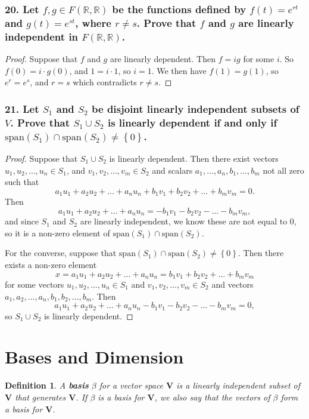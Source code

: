 \documentclass{article}
\newtheorem*{definition}{Definition}
\newcommand{\R}{\mathbb{R}}
\begin{document}
\subsubsection*{20. Let $f, g \in F(\R, \R)$ be the functions defined by $f(t) = e^{rt}$ and $g(t) = e^{st}$, where $r \ne s$. Prove that $f$ and $g$ are linearly independent in $F(\R, \R)$.}
\begin{proof}
	Suppose that $f$ and $g$ are linearly dependent. Then $f = ig$ for some $i$. So $f(0) = i \cdot g(0)$, and $1 = i \cdot 1$, so $i = 1$. We then have $f(1) = g(1)$, so $e^r = e^s$, and $r = s$ which contradicts $r \ne s$.
\end{proof}

\subsubsection*{21. Let $S_1$ and $S_2$ be disjoint linearly independent subsets of $V$. Prove that $S_1 \cup S_2$ is linearly dependent if and only if $\text{span}(S_1) \cap \text{span}(S_2) \ne \left\{0\right\}$.}
\begin{proof}
	Suppose that $S_1 \cup S_2$ is linearly dependent. Then there exist vectors $u_1, u_2, \dots, u_n \in S_1$, and $v_1, v_2, \dots, v_m \in S_2$ and scalars $a_1, \dots, a_n, b_1, \dots, b_m$ not all zero such that \[ a_1u_1 + a_2u_2 + \dots + a_nu_n + b_1v_1 + b_2v_2 + \dots + b_mv_m = 0. \]Then \[a_1u_1 + a_2u_2 + \dots + a_nu_n = -b_1v_1 - b_2v_2 - \dots - b_mv_m,\]and since $S_1$ and $S_2$ are linearly independent, we know these are not equal to 0, so it is a non-zero element of $\text{span}(S_1)\cap \text{span}(S_2)$.

	For the converse, suppose that $\text{span}(S_1)\cap\text{span}(S_2)\ne\left\{0\right\}.$ Then there exists a non-zero element \[x = a_1u_1 + a_2u_2 + \dots + a_nu_n = b_1v_1 + b_2v_2 + \dots + b_mv_m\] for some vectors $u_1, u_2, \dots, u_n \in S_1$ and $v_1, v_2, \dots, v_m \in S_2$ and vectors $a_1, a_2, \dots, a_n, b_1, b_2, \dots, b_m$. Then \[ a_1u_1 + a_2u_2 + \dots + a_nu_n - b_1v_1 - b_2v_2 - \dots - b_mv_m = 0,\] so $S_1 \cup S_2$ is linearly dependent.
\end{proof}

\section{Bases and Dimension}

\begin{definition}
    A \textbf{basis} $\beta$ for a vector space $\textbf{V}$ is a linearly independent subset of $\textbf{V}$ that generates $\textbf{V}$. If $\beta$ is a basis for $\textbf{V}$, we also say that the vectors of $\beta$ form a basis for $\textbf{V}$.
\end{definition}
\end{document}
